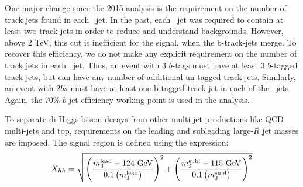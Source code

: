 One major change since the 2015 analysis is the requirement on the number of track jets found in each \largeR\ jet.  In the past, each \largeR\ jet was required to contain at least two track jets in order to reduce and understand backgrounds.  However, above 2 TeV, this cut is inefficient for the signal, when the b-track-jets merge.  To recover this efficiency, we do not make any explicit requirement on the number of track jets in each \largeR\ jet.  Thus, an event with 3 $b$-tags must have at least 3 $b$-tagged track jets, but can have any number of additional un-tagged track jets. Similarly, an event with $2bs$ must have at least one b-tagged track jet in each of the \largeR\ jets. Again, the 70\% $b$-jet efficiency working point is used in the analysis.

To separate di-Higgs-boson decays from other multi-jet productions like QCD multi-jets and top, requirements on the leading and subleading large-$R$ jet masses are imposed. The signal region is defined using the expression:
\begin{equation}
\label{eq:boosted_XhhDef}
X_{hh} = \sqrt{\left(\frac{m^{\rm lead}_{\rm J} - \text{124 GeV}}{0.1 \left(m^{\rm lead}_{\rm J}\right)}\right)^2 + \left(\frac{m^{\rm subl}_{\rm J}- \text{115 GeV}}{0.1 \left(m^{\rm subl}_{\rm J}\right)}\right)^2}
\end{equation}

